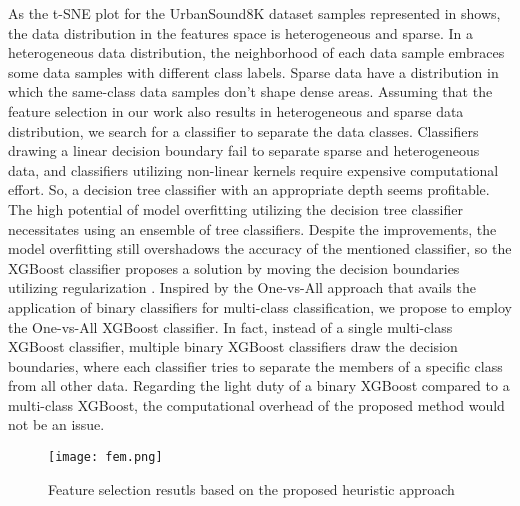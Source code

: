 \documentclass{article}
\begin{document}
As the t-SNE plot for the UrbanSound8K dataset samples represented in \citep{Sun} shows, the data distribution in the features space is heterogeneous and sparse. In a heterogeneous data distribution, the neighborhood of each data sample embraces some data samples with different class labels. Sparse data have a distribution in which the same-class data samples don't shape dense areas. Assuming that the feature selection in our work also results in heterogeneous and sparse data distribution, we search for a classifier to separate the data classes. Classifiers drawing a linear decision boundary fail to separate sparse and heterogeneous data, and classifiers utilizing non-linear kernels require expensive computational effort. So, a decision tree classifier with an appropriate depth seems profitable. The high potential of model overfitting utilizing the decision tree classifier necessitates using an ensemble of tree classifiers. Despite the improvements, the model overfitting still overshadows the accuracy of the mentioned classifier, so the XGBoost classifier proposes a solution by moving the decision boundaries utilizing regularization \citep{Elements}. Inspired by the One-vs-All approach that avails the application of binary classifiers for multi-class classification, we propose to employ the One-vs-All XGBoost classifier. In fact, instead of a single multi-class XGBoost classifier, multiple binary XGBoost classifiers draw the decision boundaries, where each classifier tries to separate the members of a specific class from all other data. Regarding the light duty of a binary XGBoost compared to a multi-class XGBoost, the computational overhead of the proposed method would not be an issue.

\begin{figure}
	\centering	
	\texttt{[image: fem.png]}  		
	\caption{Feature selection resutls based on the proposed heuristic approach}
	\label{fig: fer}
\end{figure}
 
\end{document}
